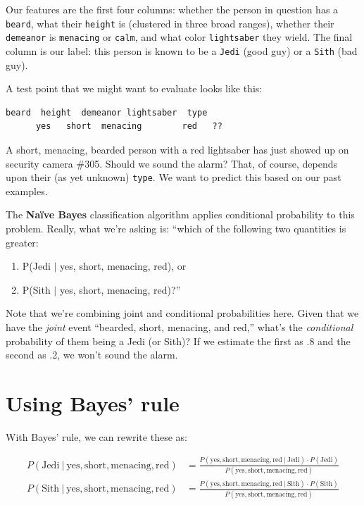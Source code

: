 Our features are the first four columns: whether the person in question has a
\texttt{beard}, what their \texttt{height} is (clustered in three broad
ranges), whether their \texttt{demeanor} is \texttt{menacing} or
\texttt{calm}, and what color \texttt{lightsaber} they wield. The final
column is our label: this person is known to be a \texttt{Jedi} (good guy) or
a \texttt{Sith} (bad guy).

A test point that we might want to evaluate looks like this:
\begin{Verbatim}[fontsize=\small,samepage=true,frame=none]
    beard  height  demeanor lightsaber  type
      yes   short  menacing        red   ?? 
\end{Verbatim}

A short, menacing, bearded person with a red lightsaber has just showed up on
security camera \#305. Should we sound the alarm? That, of course, depends
upon their (as yet unknown) \texttt{type}. We want to predict this based on
our past examples.

The \textbf{Na\"{i}ve Bayes} classification algorithm applies conditional
probability to this problem. Really, what we're asking is: ``which of
the following two quantities is greater:

\begin{enumerate}
\itemsep.05em
\item P(Jedi $|$ yes, short, menacing, red),  or
\item P(Sith $|$ yes, short, menacing, red)?''
\end{enumerate}
 
Note that we're combining joint and conditional probabilities here. Given that
we have the \textit{joint} event ``bearded, short, menacing, and red,'' what's
the \textit{conditional} probability of them being a Jedi (or Sith)? If we
estimate the first as .8 and the second as .2, we won't sound the alarm.

\section{Using Bayes' rule}

With Bayes' rule, we can rewrite these as:

\vspace{-.2in}
\begin{align}
P(\textrm{Jedi} \ | \ \textrm{yes}, \textrm{short}, \textrm{menacing},
\textrm{red}) &=
\frac{P(\textrm{yes}, \textrm{short}, \textrm{menacing}, \textrm{red} \ | \ 
\textrm{Jedi}) \cdot P(\textrm{Jedi})}{P(\textrm{yes}, \textrm{short},
\textrm{menacing},
\textrm{red})} \label{eqn:jedi} \\
P(\textrm{Sith} \ | \ \textrm{yes}, \textrm{short}, \textrm{menacing},
\textrm{red}) &=
\frac{P(\textrm{yes}, \textrm{short}, \textrm{menacing}, \textrm{red} \ | \ 
\textrm{Sith}) \cdot P(\textrm{Sith})}{P(\textrm{yes}, \textrm{short},
\textrm{menacing},
\textrm{red})}  \label{eqn:sith}
\end{align}


